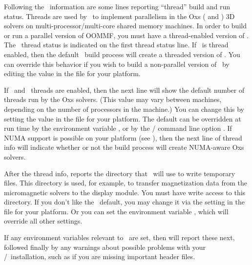 Following the \Tk\ information are some lines reporting ``thread'' build
and run status. Threads are used by \OOMMF\ to implement parallelism in
the Oxs ( and ) 3D solvers on
multi-processor/multi-core shared memory machines.  In order to build or
run a parallel version of OOMMF, you must have a thread-enabled version
of \Tcl.  The \Tcl\ thread status is indicated on the first thread
status line.  If \Tcl\ is thread enabled, then the default \OOMMF\ build
process will create a threaded version of \OOMMF.  You can override this
behavior if you wish to build a non-parallel version of \OOMMF\ by
editing the
 value in
the  file for your platform.

If \Tcl\ and \OOMMF\ threads are enabled, then the next line will show
the default number of threads run by the Oxs solvers.  (This value may
vary between machines, depending on the number of processors in the
machine.)  You can change this by setting the
 value in
the  file for your platform.  The default can be
overridden at run time by the environment variable
, or by
the / command line option .  If
NUMA support is possible on your platform (see
),
then the next line of thread info will indicate whether or not the build
process will create NUMA-aware Oxs solvers.

After the thread info,  reports the directory
that \OOMMF\ will use to write temporary files.
This directory is used, for example, to transfer magnetization data from
the micromagnetic solvers to the  display module.  You must
have write access to this directory.  If you don't like the
\OOMMF\ default, you may change it via the
setting in the  file for your platform.  Or you
can set the environment variable
, which will
override all other settings.

If any environment variables relevant to \OOMMF\ are set, then
 will report these next, followed finally by any
warnings about possible problems with your \Tcl/\Tk\ installation, such
as if you are missing important header files.

